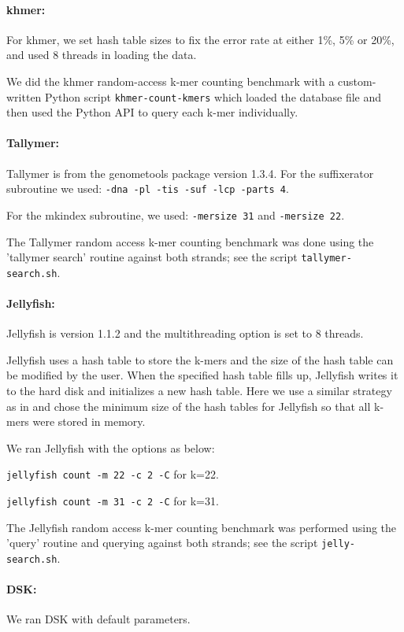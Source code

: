 \documentclass[10pt]{article}
\begin{document}
\paragraph{khmer:}
For khmer, we set hash table sizes to fix the error rate at
either 1\%, 5\% or 20\%, and used 8 threads in loading the data.

We did the khmer random-access k-mer counting benchmark with a
custom-written Python script {\tt khmer-count-kmers} which loaded the
database file and then used the Python API to query each k-mer
individually.

\paragraph{Tallymer:}
Tallymer is from the genometools package version 1.3.4. For the suffixerator subroutine 
we used:
{\tt -dna -pl -tis -suf -lcp -parts 4}.

For the mkindex subroutine, we used: {\tt -mersize 31} and {\tt -mersize 22}.

The Tallymer random access k-mer counting benchmark was done using the
'tallymer search' routine against both strands; see the script
{\tt tallymer-search.sh}.

\paragraph{Jellyfish:}
Jellyfish is version 1.1.2 and the multithreading option is set to 8 threads.

Jellyfish uses a hash table to store the k-mers and the size of the
hash table can be modified by the user.  When the specified hash table
fills up, Jellyfish writes it to the hard
disk and initializes a new hash table.  Here we use a
similar strategy as in \cite{Melsted2011} and chose the minimum size of the hash 
tables for Jellyfish so that all k-mers were stored in memory.

We ran Jellyfish with the options as below:

{\tt jellyfish count -m 22 -c 2 -C} for k=22.

{\tt jellyfish count -m 31 -c 2 -C} for k=31.

The Jellyfish random access k-mer counting benchmark was performed
using the 'query' routine and querying against both strands; see
the script {\tt jelly-search.sh}.

\paragraph{DSK:} We ran DSK with default parameters.
\end{document}
